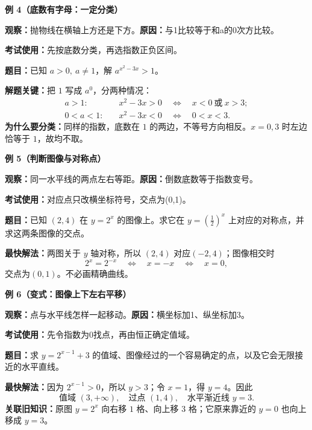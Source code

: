 \clearpage
\begin{examplebox}
\textbf{\textcolor{CExample}{例 4（底数有字母：一定分类）}}

\textbf{观察：}抛物线在横轴上方还是下方。\quad\textbf{原因：}与1比较等于和a的0次方比较。

\textbf{考试使用：}先按底数分类，再选指数正负区间。



\textbf{题目：}已知 $a>0,\ a\neq1$，解 $a^{x^2-3x}>1$。

\textbf{解题关键：}把 $1$ 写成 $a^0$，分两种情况：
\[
\begin{aligned}
 a>1:&\quad x^2-3x>0
 \quad\Longleftrightarrow\quad\boxed{x<0\ \text{或}\ x>3};\\
 0<a<1:&\quad x^2-3x<0
 \quad\Longleftrightarrow\quad\boxed{0<x<3}.
\end{aligned}
\]
\textbf{为什么要分类：}同样的指数，底数在 $1$ 的两边，不等号方向相反。$x=0,3$ 时左边恰等于 $1$，故均不取。

\medskip

\end{examplebox}
\clearpage
\begin{examplebox}
\textbf{\textcolor{CExample}{例 5（判断图像与对称点）}}

\textbf{观察：}同一水平线的两点左右等距。\quad\textbf{原因：}倒数底数等于指数变号。

\textbf{考试使用：}对应点只改横坐标符号，交点为(0,1)。



\textbf{题目：}已知 $(2,4)$ 在 $y=2^x$ 的图像上。求它在 $y=(\frac12)^x$ 上对应的对称点，并求这两条图像的交点。

\textbf{最快解法：}两图关于 $y$ 轴对称，所以 $(2,4)$ 对应\textbf{$(-2,4)$}；图像相交时
\[
  2^x=2^{-x}\quad\Longleftrightarrow\quad x=-x
  \quad\Longleftrightarrow\quad x=0,
\]
交点为\textbf{$(0,1)$}。不必画精确曲线。

\medskip

\end{examplebox}
\clearpage
\begin{examplebox}
\textbf{\textcolor{CExample}{例 6（变式：图像上下左右平移）}}

\textbf{观察：}点与水平线怎样一起移动。\quad\textbf{原因：}横坐标加1、纵坐标加3。

\textbf{考试使用：}先令指数为0找点，再由恒正确定值域。



\textbf{题目：}求 $y=2^{x-1}+3$ 的值域、图像经过的一个容易确定的点，以及它会无限接近的水平直线。

\textbf{最快解法：}因为 $2^{x-1}>0$，所以 $y>3$；令 $x=1$，得 $y=4$。因此
\[
  \boxed{\text{值域 }(3,+\infty),\quad\text{过点 }(1,4),\quad\text{水平渐近线 }y=3}.
\]
\textbf{关联旧知识：}原图 $y=2^x$ 向右移 $1$ 格、向上移 $3$ 格；它原来靠近的 $y=0$ 也向上移成 $y=3$。

\medskip
\end{examplebox}

